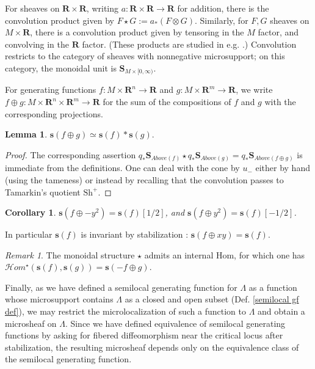 \documentclass[12pt,a4paper]{article}
\numberwithin{equation}{section}
\newtheorem{lemma}[equation]{Lemma}
\newtheorem{corollary}[equation]{Corollary}
\theoremstyle{definition}
\theoremstyle{remark}
\newtheorem{remark}[equation]{Remark}
\newcommand{\R}{\mathbf{R}}
\newcommand{\s}{\mathbf{s}}
\newcommand{\Sh}{\mathrm{Sh}}
\renewcommand{\S}{\mathbf{S}}
\begin{document}
For sheaves on $\R \times \R$, writing $a: \R \times \R \to \R$ for addition,
there is the convolution product given by
$F \star G :=  a_* (F \otimes G)$.  Similarly, for $F, G$ sheaves on $M \times \R$, there is a convolution product given by tensoring in the $M$ factor, and convolving in the $\R$ factor.  (These products are studied in e.g. \cite{Tamarkin, Guillermou-Schapira-about-Tamarkin}.)
Convolution restricts to the category of sheaves with nonnegative microsupport; on this category, the monoidal unit is $\S_{M \times [0, \infty)}$.

For generating functions
$f: M \times \R^n \to \R$ and $g: M \times \R^m \to \R$, we write $f \oplus g: M \times \R^n \times \R^m \to \R$ for the sum of the compositions of $f$ and $g$ with the corresponding projections.

\begin{lemma} \label{s and sum}
    $\s(f\oplus g)\simeq \s(f)\ast\s(g).$
\end{lemma}
\begin{proof}
    The corresponding assertion
    $q_* \S_{Above(f)} \star q_* \S_{Above(g)} = q_* \S_{Above(f\oplus g)}$
    is immediate from the definitions.
    One can deal with the cone by $u_-$ either by hand (using the tameness) or instead by recalling that the convolution passes to Tamarkin's quotient $\Sh^+$.
\end{proof}

\begin{corollary} \label{stabilization effect on sheaf}
    $\s(f \oplus -y^2) = \s(f)[1/2]$, and $\s(f \oplus y^2) = \s(f)[-1/2]$.
\end{corollary}

In particular $\s(f)$ is invariant by stabilization : $\s(f\oplus xy)=\s(f)$.


\begin{remark}
The monoidal structure $\star$ admits an internal Hom, for which one has
$\mathcal{H}om^\star(\s(f),\s(g)) = \s(-f \oplus g)$.
\end{remark}

Finally, as we have defined a semilocal generating function for $\Lambda$ as a function whose microsupport contains $\Lambda$ as a closed and open subset (Def. \ref{semilocal gf def}), we may restrict the microlocalization of such a function to $\Lambda$ and obtain a microsheaf on $\Lambda$. Since we have defined equivalence of semilocal generating functions by asking for fibered diffeomorphism near the critical locus after stabilization, the resulting microsheaf depends only on the equivalence class of the semilocal generating function.
\end{document}
